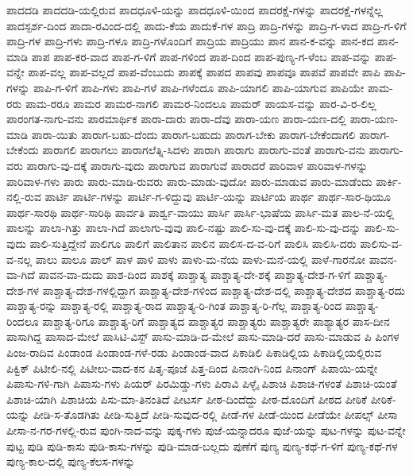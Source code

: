 {ಪಾದದಡಿ
ಪಾದದಡಿ-ಯಲ್ಲಿರುವ
ಪಾದಧೂಳಿ-ಯನ್ನು
ಪಾದಧೂಳಿ-ಯಿಂದ
ಪಾದರಕ್ಷೆ-ಗಳನ್ನು
ಪಾದರಕ್ಷೆ-ಗಳನ್ನೆಲ್ಲ
ಪಾದಸ್ಪರ್ಶ-ದಿಂದ
ಪಾದಾ-ರವಿಂದ-ದಲ್ಲಿ
ಪಾದು-ಕೆಯ
ಪಾದುಕೆ-ಗಳ
ಪಾದ್ರಿ
ಪಾದ್ರಿ-ಗಳನ್ನು
ಪಾದ್ರಿ-ಗ-ಳಾದ
ಪಾದ್ರಿ-ಗ-ಳಿಗೆ
ಪಾದ್ರಿ-ಗಳ
ಪಾದ್ರಿ-ಗಳು
ಪಾದ್ರಿ-ಗಳೂ
ಪಾದ್ರಿ-ಗಳೊಂದಿಗೆ
ಪಾದ್ರಿಯ
ಪಾದ್ರಿಯು
ಪಾನ
ಪಾನ-ಕ-ವನ್ನು
ಪಾನ-ಕದ
ಪಾನ-ಮಾಡಿ
ಪಾಪ
ಪಾಪ-ಕರ-ವಾದ
ಪಾಪ-ಗ-ಳಿಗೆ
ಪಾಪ-ಗಳಿಂದ
ಪಾಪ-ದಿಂದ
ಪಾಪ-ಪುಣ್ಯ-ಗ-ಳೆಂಬ
ಪಾಪ-ವನ್ನು
ಪಾಪ-ವನ್ನೇ
ಪಾಪ-ವಲ್ಲ
ಪಾಪ-ವಲ್ಲದೆ
ಪಾಪ-ವೆಂಬುದು
ಪಾಪಕ್ಕೆ
ಪಾಪದ
ಪಾಪವು
ಪಾಪವೂ
ಪಾಪವೆ
ಪಾಪವೇ
ಪಾಪಿ
ಪಾಪಿ-ಗಳನ್ನು
ಪಾಪಿ-ಗ-ಳಿಗೆ
ಪಾಪಿ-ಗಳು
ಪಾಪಿ-ಗಳೆ
ಪಾಪಿ-ಗಳೆಂದೂ
ಪಾಪಿ-ಯಾಗಲಿ
ಪಾಪಿ-ಯಾಗುವ
ಪಾಪಿಯೇ
ಪಾಮ-ರರು
ಪಾಮ-ರರೂ
ಪಾಮರ
ಪಾಮರ-ನಾಗಲಿ
ಪಾಮರ-ನಿಂದಲೂ
ಪಾಮರ್
ಪಾಯಸ-ವನ್ನು
ಪಾರ-ವಿ-ರ-ಲಿಲ್ಲ
ಪಾರಂಗತ-ನಾಗು-ವನು
ಪಾರಮಾರ್ಥಿಕ
ಪಾರಾ-ದಾರು
ಪಾರಾ-ದೆವು
ಪಾರಾ-ಯಣ
ಪಾರಾ-ಯಣ-ದಲ್ಲಿ
ಪಾರಾ-ಯಣ-ಮಾಡಿ
ಪಾರಾ-ಯಿತು
ಪಾರಾಗ-ಬಹು-ದೆಂದು
ಪಾರಾಗ-ಬಹುದು
ಪಾರಾಗ-ಬೇಕು
ಪಾರಾಗ-ಬೇಕೆಂದಾಗಲಿ
ಪಾರಾಗ-ಬೇಕೆಂದು
ಪಾರಾಗಲಿ
ಪಾರಾಗಲು
ಪಾರಾಗಲೆತ್ನಿ-ಸಿದಳು
ಪಾರಾಗಿ
ಪಾರಾಗು
ಪಾರಾಗು-ವಂತೆ
ಪಾರಾಗು-ವನು
ಪಾರಾಗು-ವರು
ಪಾರಾಗು-ವು-ದಕ್ಕೆ
ಪಾರಾಗು-ವುದು
ಪಾರಾಗುವ
ಪಾರಾಗುವೆ
ಪಾರಾದರೆ
ಪಾರಿವಾಳ
ಪಾರಿವಾಳ-ಗಳನ್ನು
ಪಾರಿವಾಳ-ಗಳು
ಪಾರು
ಪಾರು-ಮಾಡಿ-ರುವರು
ಪಾರು-ಮಾಡು-ವುದೋ
ಪಾರು-ಮಾಡುವ
ಪಾರು-ಮಾಡೆಂದು
ಪಾರ್ಕಿ-ನಲ್ಲಿ-ರುವ
ಪಾರ್ಟಿ
ಪಾರ್ಟಿ-ಗಳನ್ನು
ಪಾರ್ಟಿ-ಗ-ಳಿದ್ದುವು
ಪಾರ್ಟಿ-ಯನ್ನು
ಪಾರ್ಟಿಯ
ಪಾರ್ಥ
ಪಾರ್ಥ-ಸಾರ-ಥಿಯೂ
ಪಾರ್ಥ-ಸಾರಥಿ
ಪಾರ್ಥ-ಸಾರಿಥಿ
ಪಾರ್ವತಿ
ಪಾರ್ಶ್ವ-ವಾಯು
ಪಾರ್ಸಿ
ಪಾರ್ಸಿ-ಭಾಷೆಯ
ಪಾರ್ಸಿ-ಮತ
ಪಾಲ-ನೆ-ಯಲ್ಲಿ
ಪಾಲನ್ನು
ಪಾಲಾ-ಗಿತ್ತು
ಪಾಲಾ-ಗಿದೆ
ಪಾಲಾಗು-ವುವು
ಪಾಲಿ-ನಷ್ಟು
ಪಾಲಿ-ಸು-ವು-ದಕ್ಕೆ
ಪಾಲಿ-ಸು-ವು-ದನ್ನು
ಪಾಲಿ-ಸು-ವುದು
ಪಾಲಿ-ಸುತ್ತಿದ್ದೇನೆ
ಪಾಲಿಗೂ
ಪಾಲಿಗೆ
ಪಾಲಿತಾನ
ಪಾಲಿನ
ಪಾಲಿಸ-ದ-ವ-ರಿಗೆ
ಪಾಲಿಸಿ
ಪಾಲಿಸಿ-ದರು
ಪಾಲಿಸು-ವ-ವ-ನಲ್ಲ
ಪಾಲು
ಪಾಲೂ
ಪಾಲ್
ಪಾಳ
ಪಾಳಿ
ಪಾಳು
ಪಾಳು-ಮ-ನೆಯ
ಪಾಳು-ಮನೆ-ಯಲ್ಲಿ
ಪಾಳೆ-ಗಾರನೋ
ಪಾವನ-ವಾ-ಗಿದೆ
ಪಾವನ-ವಾ-ದುದು
ಪಾಶ-ದಿಂದ
ಪಾಶಕ್ಕೆ
ಪಾಶ್ಚಾತ್ಯ
ಪಾಶ್ಚಾತ್ಯ-ದೇ-ಶಕ್ಕೆ
ಪಾಶ್ಚಾತ್ಯ-ದೇಶ-ಗ-ಳಿಗೆ
ಪಾಶ್ಚಾತ್ಯ-ದೇಶ-ಗಳ
ಪಾಶ್ಚಾತ್ಯ-ದೇಶ-ಗಳಲ್ಲಿದ್ದಾಗ
ಪಾಶ್ಚಾತ್ಯ-ದೇಶ-ಗಳಿಂದ
ಪಾಶ್ಚಾತ್ಯ-ದೇಶ-ದಲ್ಲಿ
ಪಾಶ್ಚಾತ್ಯ-ದೇಶದ
ಪಾಶ್ಚಾತ್ಯ-ರದು
ಪಾಶ್ಚಾತ್ಯ-ರನ್ನು
ಪಾಶ್ಚಾತ್ಯ-ರಲ್ಲಿ
ಪಾಶ್ಚಾತ್ಯ-ರಾದ
ಪಾಶ್ಚಾತ್ಯ-ರಿ-ಗಿಂತ
ಪಾಶ್ಚಾತ್ಯ-ರಿ-ಗೆಲ್ಲ
ಪಾಶ್ಚಾತ್ಯ-ರಿಂದ
ಪಾಶ್ಚಾತ್ಯ-ರಿಂದಲೂ
ಪಾಶ್ಚಾತ್ಯ-ರಿಗೂ
ಪಾಶ್ಚಾತ್ಯ-ರಿಗೆ
ಪಾಶ್ಚಾತ್ಯದ
ಪಾಶ್ಚಾತ್ಯರ
ಪಾಶ್ಚಾತ್ಯರು
ಪಾಶ್ಚಾತ್ಯರೇ
ಪಾಶ್ಯಾತ್ಯರ
ಪಾಸ-ದೀನ
ಪಾಸಾಗಿದ್ದ
ಪಾಸಾದ-ಮೇಲೆ
ಪಾಸಿಟಿ-ವಿಸ್ಟ್
ಪಾಸು-ಮಾಡಿ-ದ-ಮೇಲೆ
ಪಾಸು-ಮಾಡಿ-ದರೆ
ಪಾಸು-ಮಾಡುವ
ಪಿ
ಪಿಂಗಳ
ಪಿಂಜ-ರಾದಿವ
ಪಿಂಡಾಂಡ
ಪಿಂಡಾಂಡ-ಗಳೆ-ರಡು
ಪಿಂಡಾಂಡ-ವಾದ
ಪಿಕಾಡಿಲಿ
ಪಿಕಾಡಿಲ್ಲಿಯ
ಪಿಕಾಡಿಲ್ಲಿಯಲ್ಲಿರುವ
ಪಿಕ್ವಿಕ್
ಪಿಟೀಲಿ-ನಲ್ಲಿ
ಪಿಟೀಲು-ವಾದ-ಕನ
ಪಿತೃ-ಪೂಜೆ
ಪಿತ್ತ-ದಿಂದ
ಪಿನಾಂಗಿ-ನಿಂದ
ಪಿನಾಂಗ್
ಪಿಪಾಯಿ-ಯನ್ನೇ
ಪಿಪಾಸು-ಗಳಿ-ಗಾಗಿ
ಪಿಪಾಸು-ಗಳು
ಪಿಯರ್
ಪಿರಮಿಡ್ಡು-ಗಳು
ಪಿರಾವಿ
ಪಿಳ್ಳೈ
ಪಿಶಾಚಿ
ಪಿಶಾಚಿ-ಗಳಂತೆ
ಪಿಶಾಚಿ-ಯಂತೆ
ಪಿಶಾಚಿ-ಯಾಗಿ
ಪಿಶಾಚಿಯ
ಪಿಸು-ಮಾ-ತಿನಂತಿದೆ
ಪೀಟರ್ಸ
ಪೀಠ-ದಿಂದೆದ್ದು
ಪೀಠ-ದೊಂದಿಗೆ
ಪೀಠದ
ಪೀಠಿಕೆ
ಪೀಠಿಕೆ-ಯನ್ನು
ಪೀಡಿ-ಸ-ತೊಡಗಿತು
ಪೀಡಿ-ಸುತ್ತಿದೆ
ಪೀಡಿ-ಸುವುದ-ರಲ್ಲಿ
ಪೀಡೆ-ಗಳ
ಪೀಡೆ-ಯಿಂದ
ಪೀಡೆಯೇ
ಪೀಪಲ್ಸ್
ಪೀಸಾ
ಪೀಸಾ-ನ-ಗರ-ಗಳಲ್ಲಿ-ರುವ
ಪುಂಗಿ-ನಾದ-ವನ್ನು
ಪುಕ್ಕ-ಗಳು
ಪುಜೆ-ಯನ್ನಾದರೂ
ಪುಜೆ-ಯನ್ನು
ಪುಟ-ಗಳನ್ನು
ಪುಟ-ವನ್ನೇ
ಪುಟ್ಟ
ಪುಡಿ
ಪುಡಿ-ಕಾಸು
ಪುಡಿ-ಕಾಸು-ಗಳನ್ನು
ಪುಡಿ-ಮಾಡ-ಬಲ್ಲದು
ಪುಣೆಗೆ
ಪುಣ್ಯ
ಪುಣ್ಯ-ಕಥೆ-ಗ-ಳಿಗೆ
ಪುಣ್ಯ-ಕಥೆ-ಗಳ
ಪುಣ್ಯ-ಕಾಲ-ದಲ್ಲಿ
ಪುಣ್ಯ-ಕೆಲಸ-ಗಳನ್ನು
}

